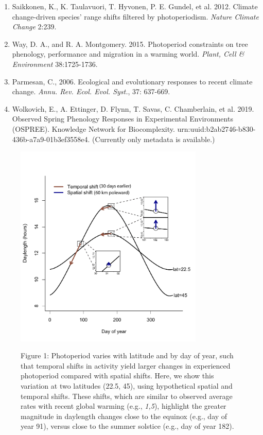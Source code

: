 \documentclass[10.7pt,a4paper]{letter}
\begin{document}
\begin{letter}{}
\begin{footnotesize}
\begin{enumerate}
\item Saikkonen, K., K. Taulavuori, T. Hyvonen, P. E. Gundel, et al. 2012. Climate change-driven species' range shifts filtered by photoperiodism. \emph{Nature Climate Change} 2:239.
\item Way, D. A., and R. A. Montgomery. 2015. Photoperiod constraints on tree phenology, performance and migration in a warming world. \emph{Plant, Cell \& Environment} 38:1725-1736.
\item Parmesan, C., 2006. Ecological and evolutionary responses to recent climate change.  \emph{Annu. Rev. Ecol. Evol. Syst.}, 37: 637-669.
\item Wolkovich, E., A. Ettinger, D. Flynn, T. Savas, C. Chamberlain, et al. 2019. Observed Spring Phenology Responses in Experimental Environments (OSPREE). Knowledge Network for Biocomplexity. urn:uuid:b2ab2746-b830-436b-a7a9-01b3ef3558e4. (Currently only metadata is available.)
\end{enumerate}

\begin{figure}
\centering
\includegraphics[width=90mm,scale=0.5]{..//..//analyses/photoperiod/figures/photo_spacetime_v2.pdf} \\

\caption{Figure 1: Photoperiod varies with latitude and by day of year, such that temporal shifts in activity yield larger changes in experienced photoperiod compared with spatial shifts. Here, we show this variation at two latitudes (22.5\degree, 45\degree), using hypothetical spatial and temporal shifts. These shifts,
which are similar to observed average rates with recent global warming (e.g., \emph{1,5}), highlight the greater magnitude in daylength changes close to the equinox (e.g., day of
year 91), versus close to the summer solstice (e.g., day of year 182).}
 \label{fig:condiag}
 \end{figure}
 

\end{footnotesize}
\end{letter}
\end{document}
